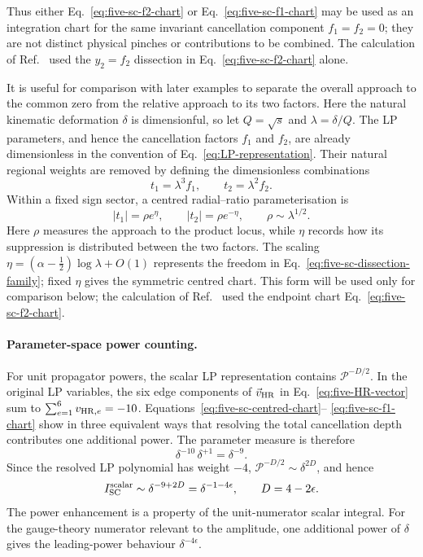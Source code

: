 \documentclass[a4paper,11pt]{article}
\begin{document}
Thus either Eq.~\eqref{eq:five-sc-f2-chart} or
Eq.~\eqref{eq:five-sc-f1-chart} may be used as an integration chart for the
same invariant cancellation component \(f_1=f_2=0\); they are not distinct
physical pinches or contributions to be combined.  The calculation of
Ref.~\cite{Chen:2026dnj} used the \(y_2=f_2\) dissection in
Eq.~\eqref{eq:five-sc-f2-chart} alone.

It is useful for comparison with later examples to separate the overall
approach to the common zero from the relative approach to its two factors.
Here the natural kinematic deformation \(\delta\) is dimensionful, so let
\(Q=\sqrt{s}\) and \(\lambda=\delta/Q\).  The LP parameters, and hence the
cancellation factors \(f_1\) and \(f_2\), are already dimensionless in the
convention of Eq.~\eqref{eq:LP-representation}.  Their natural regional
weights are removed by defining the dimensionless combinations
\[
 t_1=\lambda^3 f_1,
 \qquad
 t_2=\lambda^2 f_2.
\]
Within a fixed sign sector,
a centred radial--ratio parameterisation is
\begin{equation}
 |t_1|=\rho e^\eta,\qquad |t_2|=\rho e^{-\eta},\qquad
 \rho\sim\lambda^{1/2}.
 \label{eq:five-sc-radial-ratio-chart}
\end{equation}
Here \(\rho\) measures the approach to the product locus, while \(\eta\)
records how its suppression is distributed between the two factors.
The scaling
\(\eta=(\alpha-\tfrac12)\log\lambda+O(1)\) represents the freedom in
Eq.~\eqref{eq:five-sc-dissection-family}; fixed \(\eta\) gives the symmetric
centred chart.  This form will be used only for comparison below; the
calculation of Ref.~\cite{Chen:2026dnj} used the endpoint chart
Eq.~\eqref{eq:five-sc-f2-chart}.

\paragraph{Parameter-space power counting.}

For unit propagator powers, the scalar LP representation contains
\(\mathcal P^{-D/2}\).  In the original LP variables, the six edge
components of \(\vec v_{\rm HR}\) in Eq.~\eqref{eq:five-HR-vector} sum to
\(\sum_{e=1}^{6}v_{{\rm HR},e}=-10\).  Equations~\eqref{eq:five-sc-centred-chart}--
\eqref{eq:five-sc-f1-chart} show in three equivalent ways that resolving the
total cancellation depth contributes one additional power.  The parameter
measure is therefore
\begin{equation}
 \delta^{-10}\,\delta^{+1}=\delta^{-9}.
 \label{eq:five-sc-parameter-measure}
\end{equation}
Since the resolved LP polynomial has weight \(-4\),
\(\mathcal P^{-D/2}\sim\delta^{2D}\), and hence
\begin{equation}
 I_{\rm SC}^{\rm scalar}\sim
 \delta^{-9+2D}=\delta^{-1-4\epsilon},
 \qquad D=4-2\epsilon.
 \label{eq:five-sc-parameter-power}
\end{equation}
The power enhancement is a property of the unit-numerator scalar integral.
For the gauge-theory numerator relevant to the amplitude, one additional
power of \(\delta\) gives the leading-power behaviour
\(\delta^{-4\epsilon}\).
\end{document}
